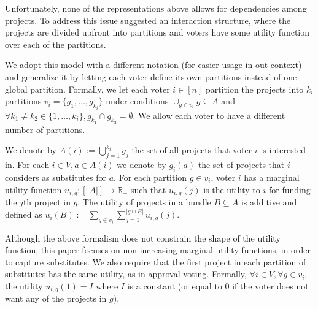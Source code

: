 \documentclass[runningheads]{llncs}
\begin{document}
Unfortunately, none of the representations above allows for dependencies among projects. To address this issue \citet{jain2020participatory} suggested an interaction structure, where the projects are divided upfront into partitions and voters have some utility function over each of the partitions.

We adopt this model with a different notation (for easier usage in out context) and generalize it by letting each voter define its own partitions instead of one global partition.
Formally, we let  each voter $i\in [n]$ partition the projects into $k_i$ partitions $v_i=\{g_1,\ldots,g_{k_i}\}$ under conditions  $\cup_{g\in v_i}g\subseteq A$ and $\forall k_1\neq k_2 \in \{1,\ldots,k_i\}, g_{k_1}\cap g_{k_2}=\emptyset$. We allow each voter to have a different number of  partitions. 

We denote by $A(i):=\bigcup_{j=1}^{k_i}g_j$ the set of all projects that voter $i$ is interested in. 
 For each $i\in V, a\in A(i)$ we denote by $g_i(a)$ the set of projects that $i$ considers as substitutes for $a$.
 For each partition  $g\in v_i$,   voter $i$ has a marginal utility function $u_{i,g}:[|A|]\rightarrow \mathbb{R}_+$  
such that $u_{i,g}(j)$ is the utility to $i$ for funding the $j$th project in $g$. 
The utility of projects in a bundle $B\subseteq A$ is additive and defined as 
$u_i(B):=\sum_{g\in{v_i}}\sum_{j=1}^{|g\cap B|}u_{i,g}(j).$
 
 Although the  above formalism does not constrain the shape of the utility function, this paper  focuses  on non-increasing marginal utility functions, in order to capture   substitutes.
We also  require that  the first project in each partition of substitutes has the same utility, as in approval voting. Formally,   $\forall i\in V, \forall g\in v_i,$ the utility $u_{i,g}(1)=I$ where $I$ is a constant (or equal to 0 if the voter does not want any of the projects in $g$). 
\end{document}
